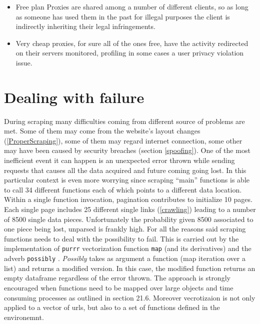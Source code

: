 \documentclass[
  12pt,
  a4paper,
  oneside]{book}
\newcommand{\passthrough}[1]{#1}
\providecommand{\tightlist}{%
  \setlength{\itemsep}{0pt}\setlength{\parskip}{0pt}}
\theoremstyle{definition}
\theoremstyle{definition}
\theoremstyle{definition}
\theoremstyle{remark}
\begin{document}
\begin{itemize}
\tightlist
\item
  Free plan Proxies are shared among a number of different clients, so as long as someone has used them in the past for illegal purposes the client is indirectly inheriting their legal infringements.
\item
  Very cheap proxies, for sure all of the ones free, have the activity redirected on their servers monitored, profiling in some cases a user privacy violation issue.
\end{itemize}

\hypertarget{possibly}{%
\section{Dealing with failure}\label{possibly}}

During scraping many difficulties coming from different source of problems are met. Some of them may come from the website's layout changes (\ref{ProperScraping}), some of them may regard internet connection, some other may have been caused by security breaches (section \ref{spoofing}).
One of the most inefficient event it can happen is an unexpected error thrown while sending requests that causes all the data acquired and future coming going lost. In this particular context is even more worrying since scraping ``main'' functions is able to call 34 different functions each of which points to a different data location. Within a single function invocation, pagination contributes to initialize 10 pages. Each single page includes 25 different single links (\ref{crawling}) leading to a number of 8500 single data pieces. Unfortunately the probability given 8500 associated to one piece being lost, unparsed is frankly high.
For all the reasons said scraping functions needs to deal with the possibility to fail. This is carried out by the implementation of \passthrough{\lstinline!purrr!} vectorization function \passthrough{\lstinline!map!} (and its derivatives) and the adverb \passthrough{\lstinline!possibly!} \citet{possibly}. \emph{Possibly} takes as argument a function (map iteration over a list) and returns a modified version. In this case, the modified function returns an empty dataframe regardless of the error thrown. The approach is strongly encouraged when functions need to be mapped over large objects and time consuming processes as outlined in \citet{Rdatascience} section 21.6. Moreover vecrotizaion is not only applied to a vector of urls, but also to a set of functions defined in the environemnt.
\end{document}
